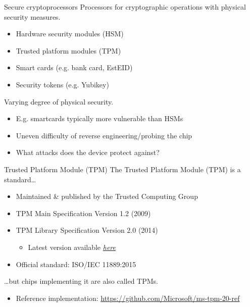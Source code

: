 \begin{frame}{Secure cryptoprocessors}
  Processors for cryptographic operations with physical security measures.
  \begin{itemize}[<+(1)->]
    \item Hardware security modules (HSM)
    \item Trusted platform modules (TPM)
    \item Smart cards (e.g. bank card, EstEID)
    \item Security tokens (e.g. Yubikey)
  \end{itemize}

  \vspace*{1em}

  \pause
  Varying degree of physical security.
  \begin{itemize}[<+(1)->]
    \item E.g. smartcards typically more vulnerable than HSMs
    \item Uneven difficulty of reverse engineering/probing the chip
    \item What attacks does the device protect against?
  \end{itemize}
\end{frame}

\begin{frame}{Trusted Platform Module (TPM)}
  \pause
  The Trusted Platform Module (TPM) is a standard\dots
  \begin{itemize}[<+(1)->]
    \item Maintained \& published by the Trusted Computing Group
    \item TPM Main Specification Version 1.2 (2009)
    \item TPM Library Specification Version 2.0 (2014)
    \begin{itemize}
      \item Latest version available \href{https://trustedcomputinggroup.org/resource/tpm-library-specification/}{\textit{here}}
    \end{itemize}
    \item Official standard: ISO/IEC 11889:2015
  \end{itemize}

  \pause
  \dots{}but chips implementing it are also called TPMs.
  \begin{itemize}
    \item Reference implementation: {\small\url{https://github.com/Microsoft/ms-tpm-20-ref}}
  \end{itemize}
\end{frame}


